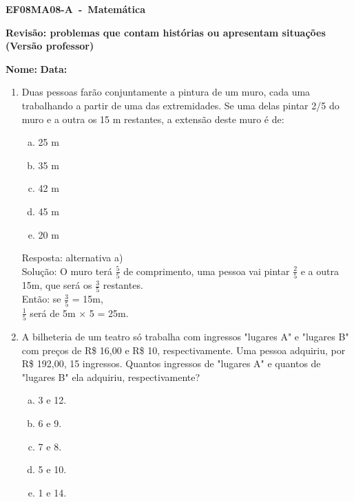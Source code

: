 \documentclass[a4paper,14pt]{article}
\begin{document}
	
	\noindent\textbf{EF08MA08-A~-~Matemática} 
	
	\begin{center}
		\textbf{Revisão: problemas que contam histórias ou apresentam situações (Versão professor)}
	\end{center}
	
	
	\noindent\textbf{Nome:} \underline{\hspace{10cm}}
    \noindent\textbf{Data:} \underline{\hspace{4cm}}
	
	
	\begin{multicols}{2}
	\begin{enumerate}	
		\item Duas pessoas farão conjuntamente a pintura de um muro, cada uma trabalhando a partir de uma das extremidades. Se uma delas pintar 2/5 do muro e a outra os 15 m restantes, a extensão deste muro é de: 
		\begin{enumerate}[a)]
			\item 25 m
			\item 35 m
			\item 42 m
			\item 45 m
			\item 20 m
	    \end{enumerate}
    
        Resposta: alternativa a) \\
        
        Solução: O muro terá $\frac{5}{5}$ de comprimento, uma pessoa vai pintar $\frac{2}{5}$ e a outra 15m, que será os $\frac{3}{5}$ restantes. \\
        Então: se $\frac{3}{5}$ = 15m, \\$\frac{1}{5}$ será de 5m $\times$ 5 = 25m.
        
        \item A bilheteria de um teatro só trabalha com ingressos "lugares A" e "lugares B" com preços de R\$ 16,00 e R\$ 10, respectivamente. Uma pessoa adquiriu, por R\$ 192,00, 15 ingressos. Quantos ingressos de "lugares A" e quantos de "lugares B" ela adquiriu, respectivamente?
        \begin{enumerate}[a)]
        	\item 3 e 12.
        	\item 6 e 9.
        	\item 7 e 8.
        	\item 5 e 10.
        	\item 1 e 14.
        \end{enumerate}
    

\end{enumerate}
\end{multicols}
\end{document}
